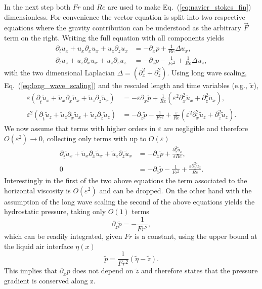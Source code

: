In the next step both $Fr$ and $Re$ are used to make Eq.~(\ref{eq:navier_stokes_fin}) dimensionless.
For convenience the vector equation is split into two respective equations where the gravity contribution can be understood as the arbitrary $\vec{F}$ term on the right.
Writing the full equation with all components yields
\begin{align}\label{eq:2d_RNS}
    \partial_t u_x + u_x\partial_x u_x + u_z\partial_z u_x &= -\partial_x p + \frac{1}{Re}\Delta u_x ,\\
    \partial_t u_z + u_z\partial_x u_x + u_z\partial_z u_z &= -\partial_z p - \frac{1}{Fr^2} + \frac{1}{Re}\Delta u_z ,
\end{align}
with the two dimensional Laplacian $\Delta = (\partial_x^2 + \partial_z^2)$.
Using long wave scaling, Eq.~(\ref{eq:long_wave_scaling}) and the rescaled length and time variables (e.g., $\tilde{x}$),
\begin{align}\label{eq:2d_RNS_eps}
    \varepsilon(\partial_{\tilde{t}} \tilde{u}_x + \tilde{u}_x \partial_{\tilde{x}} \tilde{u}_x + \tilde{u}_z \partial_{\tilde{z}} \tilde{u}_x ) &= -\varepsilon\partial_{\tilde{x}} \tilde{p} + \frac{1}{Re}(\varepsilon^2 \partial_{\tilde{x}}^2 \tilde{u}_x + \partial_{\tilde{z}}^2 \tilde{u}_x ) ,\\
    \varepsilon^2(\partial_{\tilde{t}} \tilde{u}_z + \tilde{u}_z\partial_{\tilde{x}} \tilde{u}_x + \tilde{u}_z\partial_{\tilde{z}} \tilde{u}_z) &= -\partial_{\tilde{z}}\tilde{p} - \frac{1}{Fr^2} + \frac{\varepsilon}{Re}(\varepsilon^2 \partial_{\tilde{x}}^2 \tilde{u}_z + \partial_{\tilde{z}}^2 \tilde{u}_z ) .
\end{align}
We now assume that terms with higher orders in $\varepsilon$ are negligible and therefore $O(\varepsilon^2) \rightarrow 0$, collecting only terms with up to $O(\varepsilon)$
\begin{align}\label{eq:2d_RNS_linear}
    \partial_{\tilde{t}} \tilde{u}_x + \tilde{u}_x\partial_{\tilde{x}} \tilde{u}_x + \tilde{u}_z\partial_{\tilde{z}} \tilde{u}_x &= -\partial_{\tilde{x}} \tilde{p} + \frac{\partial_{\tilde{z}}^2\tilde{u}_x}{\varepsilon Re}, \\
    0 &= -\partial_{\tilde{z}}\tilde{p} - \frac{1}{Fr^2} + \frac{\varepsilon\partial_{\tilde{z}}^2 \tilde{u}_z}{Re} .
\end{align}
Interestingly in the first of the two above equations the term associated to the horizontal viscosity is $O(\varepsilon^2)$ and can be dropped.
On the other hand with the assumption of the long wave scaling the second of the above equations yields the hydrostatic pressure, taking only $O(1)$ terms
\begin{equation}\label{eq:hydro_static}
    \partial_{\tilde{z}}\tilde{p} = -\frac{1}{Fr^2},
\end{equation}
which can be readily integrated, given $Fr$ is a constant, using the upper bound at the liquid air interface $\eta(x)$ 
\begin{equation}\label{eq:hydro_static_int}
    \tilde{p} = \frac{1}{Fr^2}(\tilde{\eta} - \tilde{z}).   
\end{equation}
This implies that $\partial_{\tilde{x}}p$ does not depend on $\tilde{z}$ and therefore states that the pressure gradient is conserved along z.

